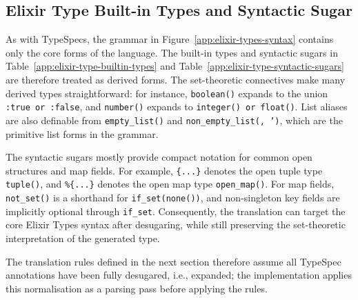 \subsection{Elixir Type Built-in Types and Syntactic Sugar}



As with TypeSpecs, the grammar in Figure~\ref{app:elixir-types-syntax} contains only the core forms of the language.
The built-in types and syntactic sugars in Table~\ref{app:elixir-type-builtin-types} and Table~\ref{app:elixir-type-syntactic-sugars} are therefore treated as derived forms.
The set-theoretic connectives make many derived types straightforward: for instance, \texttt{boolean()} expands to the union \texttt{:true or :false}, and \texttt{number()} expands to \texttt{integer() or float()}.
List aliases are also definable from \texttt{empty\_list()} and \texttt{non\_empty\_list(\ETT, \ETT')}, which are the primitive list forms in the grammar.

The syntactic sugars mostly provide compact notation for common open structures and map fields.
For example, \texttt{\{...\}} denotes the open tuple type \texttt{tuple()}, and \texttt{\%\{...\}} denotes the open map type \texttt{open\_map()}.
For map fields, \texttt{not\_set()} is a shorthand for \texttt{if\_set(none())}, and non-singleton key fields are implicitly optional through \texttt{if\_set}.
Consequently, the translation can target the core Elixir Types syntax after desugaring, while still preserving the set-theoretic interpretation of the generated type.

The translation rules defined in the next section therefore assume all TypeSpec annotations have been fully desugared, i.e., expanded; the implementation applies this normalisation as a parsing pass before applying the rules.